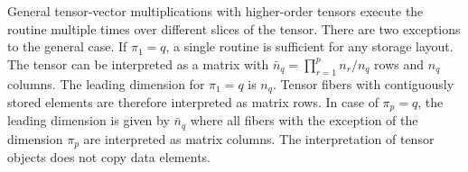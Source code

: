 General tensor-vector multiplications with higher-order tensors execute the  routine multiple times over different slices of the tensor.
There are two exceptions to the general case.%
If $\pi_1 = q$, a single  routine is sufficient for any storage layout.
The tensor can be interpreted as a matrix with $\bar{n}_q = \prod_{r=1}^p n_r / n_q$ rows and $n_q$ columns.
The leading dimension  for $\pi_1=q$ is $n_q$.
Tensor fibers with contiguously stored elements are therefore interpreted as matrix rows.
In case of $\pi_p=q$, the leading dimension  is given by $\bar{n}_q$ where all fibers with the exception of the dimension $\pi_p$ are interpreted as matrix columns.
The interpretation of tensor objects does not copy data elements.

